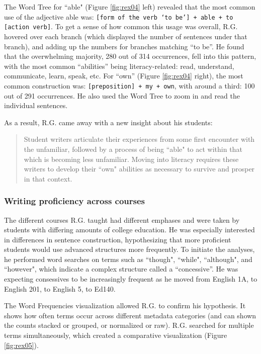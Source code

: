 \documentclass{sig-alternate}
\newcommand{\code}[1] {\texttt{#1}}
\begin{document}
The Word Tree for ``able" (Figure \ref{fig:rex04} left) revealed that the most common use of the adjective able was: \code{[form of the verb `to be'] + able + to [action verb]}. To get a sense of how common this usage was overall, R.G. hovered over each branch (which displayed the number of sentences under that branch), and adding up the numbers for branches matching ``to be''. He found that the overwhelming majority, 280 out of 314 occurrences, fell into this pattern, with the most common ``abilities'' being literacy-related: read, understand, communicate, learn, speak, etc. For  ``own'' (Figure \ref{fig:rex04} right), the most common construction was: \code{[preposition] + my + own}, with around a third: 100 out of 291 occurrences.  He also used the Word Tree to zoom in and read the individual sentences.

As a result, R.G. came away with a new insight about his students:
\begin{quote}
Student writers articulate their experiences from some first encounter with the unfamiliar, followed by a process of being ``able" to act within that which is becoming less unfamiliar.  Moving into literacy requires these writers to develop their ``own" abilities as necessary to survive and prosper in that context.
\end{quote} 

\subsubsection{Writing proficiency across courses}
The different courses R.G. taught had different emphases and were taken by students with differing amounts of college education. He was especially interested in differences in sentence construction, hypothesizing that more proficient students would use advanced structures more frequently. To initiate the analyses, he performed word searches on terms such as ``though", ``while", ``although", and ``however", which indicate a complex structure called a ``concessive''. He was expecting consessives to be increasingly frequent as he moved from English 1A, to English 201, to English 5, to Ed140.

The Word Frequencies visualization allowed R.G. to confirm his hypothesis. It shows how often terms occur across different metadata categories (and can shown the counts stacked or grouped, or normalized or raw). R.G. searched for multiple terms simultaneously, which created a comparative visualization (Figure \ref{fig:rex05}).
\end{document}
